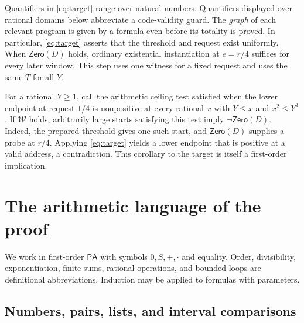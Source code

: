 \documentclass[11pt]{amsart}
\theoremstyle{definition}
\theoremstyle{remark}
\numberwithin{equation}{section}
\newcommand{\PA}{\mathsf{PA}}
\newcommand{\Zero}{\mathsf{Zero}}
\begin{document}
Quantifiers in \eqref{eq:target} range over natural numbers. Quantifiers
displayed over rational domains below abbreviate a code-validity guard.
The \emph{graph} of each relevant program is given by a formula even
before its totality is proved. In particular, \eqref{eq:target} asserts
that the threshold and request exist uniformly. When $\Zero(D)$ holds,
ordinary existential instantiation at $e=r/4$ suffices for every later
window. This step uses one witness for a fixed request and uses the same
$T$ for all $Y$.

For a rational $Y\ge1$, call the arithmetic ceiling test satisfied
when the lower endpoint at request $1/4$ is nonpositive at every
rational $x$ with $Y\le x$ and $x^2\le Y^3$. If $\mathcal W$ holds,
arbitrarily large starts satisfying this test imply $\neg\Zero(D)$.
Indeed, the prepared threshold gives one such start, and $\Zero(D)$
supplies a probe at $r/4$. Applying \eqref{eq:target} yields a lower
endpoint that is positive at a valid address, a contradiction.
This corollary to the target is itself a first-order implication.

\section{The arithmetic language of the proof}
\label{sec:graphs}

We work in first-order $\PA$ with symbols $0,S,+,\cdot$ and equality.
Order, divisibility, exponentiation, finite sums, rational operations,
and bounded loops are definitional abbreviations. Induction may be
applied to formulas with parameters.

\subsection{Numbers, pairs, lists, and interval comparisons}
\end{document}
